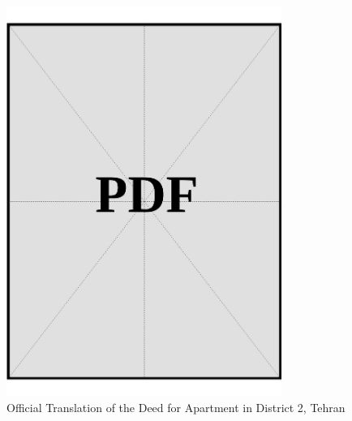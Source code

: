 \vspace*{\fill}
\begin{figure}[h]
    \centering
    \includegraphics[page=1, width=0.8\textwidth]{../docs/sponsor/funds/property-deeds/property-2/official-translations.pdf}
    \caption{Official Translation of the Deed for Apartment in District 2, Tehran}
    \label{fig:sponsor-apartment-dist2-tehran-official-translation}
\end{figure}
\vspace*{\fill}

\clearpage


